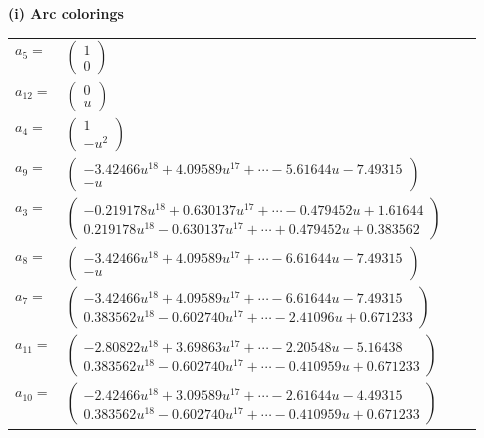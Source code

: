 \documentclass[1p]{elsarticle_modified}
\theoremstyle{definition}
\begin{document}
\flushleft \textbf{(i) Arc colorings}\\
\begin{tabular}{m{7pt} m{180pt} m{7pt} m{180pt} }
\flushright $a_{5}=$&$\begin{pmatrix}1\\0\end{pmatrix}$ \\
\flushright $a_{12}=$&$\begin{pmatrix}0\\u\end{pmatrix}$ \\
\flushright $a_{4}=$&$\begin{pmatrix}1\\- u^2\end{pmatrix}$ \\
\flushright $a_{9}=$&$\begin{pmatrix}-3.42466 u^{18}+4.09589 u^{17}+\cdots-5.61644 u-7.49315\\- u\end{pmatrix}$ \\
\flushright $a_{3}=$&$\begin{pmatrix}-0.219178 u^{18}+0.630137 u^{17}+\cdots-0.479452 u+1.61644\\0.219178 u^{18}-0.630137 u^{17}+\cdots+0.479452 u+0.383562\end{pmatrix}$ \\
\flushright $a_{8}=$&$\begin{pmatrix}-3.42466 u^{18}+4.09589 u^{17}+\cdots-6.61644 u-7.49315\\- u\end{pmatrix}$ \\
\flushright $a_{7}=$&$\begin{pmatrix}-3.42466 u^{18}+4.09589 u^{17}+\cdots-6.61644 u-7.49315\\0.383562 u^{18}-0.602740 u^{17}+\cdots-2.41096 u+0.671233\end{pmatrix}$ \\
\flushright $a_{11}=$&$\begin{pmatrix}-2.80822 u^{18}+3.69863 u^{17}+\cdots-2.20548 u-5.16438\\0.383562 u^{18}-0.602740 u^{17}+\cdots-0.410959 u+0.671233\end{pmatrix}$ \\
\flushright $a_{10}=$&$\begin{pmatrix}-2.42466 u^{18}+3.09589 u^{17}+\cdots-2.61644 u-4.49315\\0.383562 u^{18}-0.602740 u^{17}+\cdots-0.410959 u+0.671233\end{pmatrix}$ \\

\end{tabular}
\end{document}
